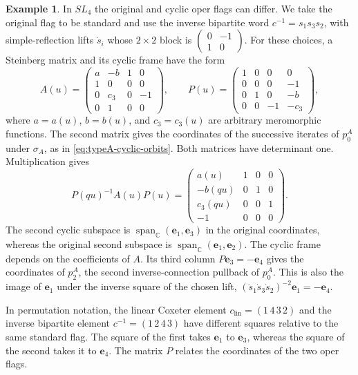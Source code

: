 \documentclass[11pt,leqno]{amsart}
\numberwithin{equation}{section}
\theoremstyle{plain}
\theoremstyle{definition}
\theoremstyle{plain}
\theoremstyle{definition}
\newtheorem{example}[theorem]{Example}
\theoremstyle{remark}
\begin{document}
\begin{example}\label{ex:typeA-distinct-flag-orders}
In $SL_4$ the original and cyclic oper flags can differ. We take the original flag to be standard and use the inverse bipartite word $c^{-1}=s_1s_3s_2$, with simple-reflection lifts $\dot s_i$ whose $2\times2$ block is $\left(\begin{smallmatrix}0&-1\\1&0\end{smallmatrix}\right)$.  For these choices, a Steinberg matrix and its cyclic frame have the form
\begin{equation}\label{eq:SL4-explicit-bipartite-cyclic}
 A(u)=\begin{pmatrix}
 a&-b&1&0\\1&0&0&0\\0&c_3&0&-1\\0&1&0&0
 \end{pmatrix},\qquad
 P(u)=\begin{pmatrix}
 1&0&0&0\\0&0&0&-1\\0&1&0&-b\\0&0&-1&-c_3
 \end{pmatrix},
\end{equation}
where $a=a(u)$, $b=b(u)$, and $c_3=c_3(u)$ are arbitrary meromorphic functions.  The second matrix gives the coordinates of the successive iterates of $p_0^A$ under $\sigma_A$, as in \eqref{eq:typeA-cyclic-orbits}.  Both matrices have determinant one.  Multiplication gives
\begin{equation}\label{eq:SL4-explicit-companion-gauge}
 P(qu)^{-1}A(u)P(u)
 =\begin{pmatrix}
 a(u)&1&0&0\\-b(qu)&0&1&0\\c_3(qu)&0&0&1\\-1&0&0&0
 \end{pmatrix}.
\end{equation}
The second cyclic subspace is $\operatorname{span}_{\mathbb C}(\mathbf e_1,\mathbf e_3)$ in the original coordinates, whereas the original second subspace is $\operatorname{span}_{\mathbb C}(\mathbf e_1,\mathbf e_2)$. The cyclic frame depends on the coefficients of $A$.  Its third column $P\mathbf e_3=-\mathbf e_4$ gives the coordinates of $p_2^A$, the second inverse-connection pullback of $p_0^A$.  This is also the image of $\mathbf e_1$ under the inverse square of the chosen lift, $(\dot s_1\dot s_3\dot s_2)^{-2}\mathbf e_1=-\mathbf e_4$.

In permutation notation, the linear Coxeter element $c_{\mathrm{lin}}=(1\,4\,3\,2)$ and the inverse bipartite element $c^{-1}=(1\,2\,4\,3)$ have different squares relative to the same standard flag.  The square of the first takes $\mathbf e_1$ to $\mathbf e_3$, whereas the square of the second takes it to $\mathbf e_4$.  The matrix $P$ relates the coordinates of the two oper flags.
\end{example}
\end{document}
